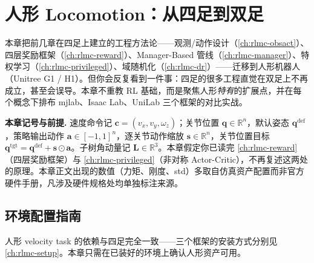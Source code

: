\chapter{人形 Locomotion：从四足到双足}\label{ch:rlmc-humanoidloco}


本章把前几章在四足上建立的工程方法论——观测/动作设计（\cref{ch:rlmc-obsact}）、四层奖励框架（\cref{ch:rlmc-reward}）、Manager-Based 管线（\cref{ch:rlmc-manager}）、特权学习（\cref{ch:rlmc-privileged}）、域随机化（\cref{ch:rlmc-dr}）——迁移到人形机器人（Unitree G1 / H1）。但你会反复看到一件事：四足的很多工程直觉在双足上不再成立，甚至会误导。本章不重教 RL 基础，而是聚焦人形\emph{特有}的扩展点，并在每个概念下排布 mjlab、Isaac Lab、UniLab 三个框架的对比实战。

\begin{note}
\textbf{本章记号与前提.}\;
速度命令记 $\mathbf{c}=(v_x,v_y,\omega_z)$；关节位置 $\mathbf{q}\in\mathbb{R}^{n}$，默认姿态 $\mathbf{q}^{\mathrm{def}}$，策略输出动作 $\mathbf{a}\in[-1,1]^n$，逐关节动作缩放 $\boldsymbol{s}\in\mathbb{R}^n$，关节位置目标 $\mathbf{q}^{\mathrm{tgt}}=\mathbf{q}^{\mathrm{def}}+\boldsymbol{s}\odot\mathbf{a}$。子树角动量记 $\mathbf{L}\in\mathbb{R}^3$。本章假定你已读完 \cref{ch:rlmc-reward}（四层奖励框架）与 \cref{ch:rlmc-privileged}（非对称 Actor-Critic），不再复述这两处的原理。本章正文出现的数值（力矩、刚度、std）多取自仿真资产配置而非官方硬件手册，凡涉及硬件规格处均单独标注来源。
\end{note}

\section*{环境配置指南}

人形 velocity task 的依赖与四足完全一致——三个框架的安装方式分别见 \cref{ch:rlmc-setup}。本章只需在已装好的环境上确认人形资产可用。

